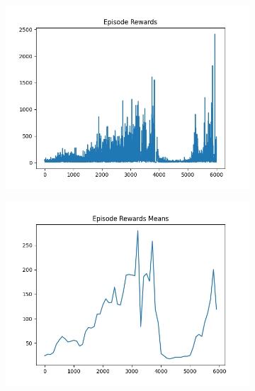 \begin{figure}[H]
    \centering
    \begin{subfigure}{.47\linewidth}
        \centering
        \includegraphics[width=\textwidth]{pole/2024-06-14_19-20-40_dqn_cartpole_episode_rewards.png}
    \end{subfigure}
    \begin{subfigure}{.47\linewidth}
        \centering
        \includegraphics[width=\textwidth]{pole/2024-06-14_19-20-40_dqn_cartpole_episode_rewards_means.png}
    \end{subfigure}
    \begin{subfigure}{.47\linewidth}
        \centering

\end{subfigure}
\end{figure}
